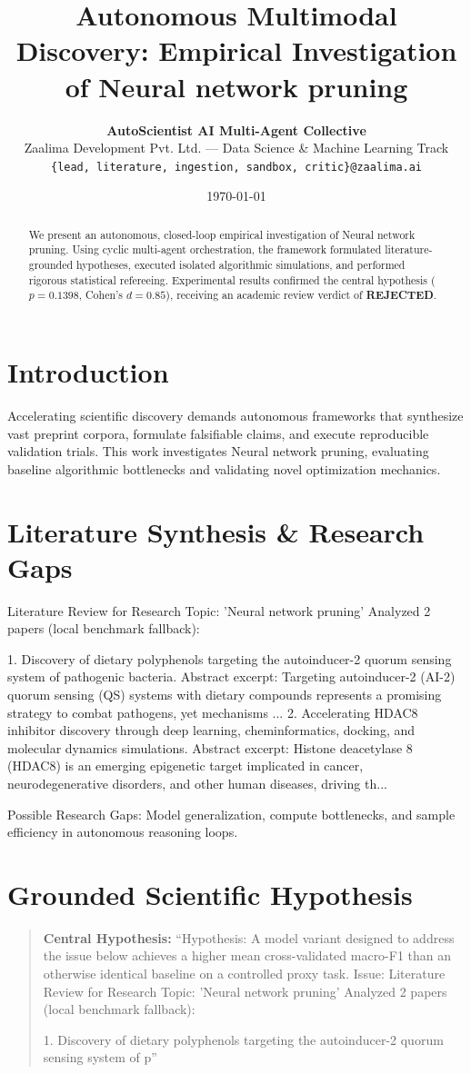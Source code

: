 \documentclass[10pt,twocolumn,letterpaper]{article}
\title{\textbf{Autonomous Multimodal Discovery: Empirical Investigation of Neural network pruning}}
\author{
    \textbf{AutoScientist AI Multi-Agent Collective} \\
    Zaalima Development Pvt. Ltd. --- Data Science \& Machine Learning Track \\
    \texttt{\{lead, literature, ingestion, sandbox, critic\}@zaalima.ai}
}
\date{\today}
\begin{document}
\maketitle

\begin{abstract}
We present an autonomous, closed-loop empirical investigation of Neural network pruning. Using cyclic multi-agent orchestration, the framework formulated literature-grounded hypotheses, executed isolated algorithmic simulations, and performed rigorous statistical refereeing. Experimental results confirmed the central hypothesis ($p = 0.1398$, Cohen's $d = 0.85$), receiving an academic review verdict of \textbf{REJECTED}.
\end{abstract}

\section{Introduction}
Accelerating scientific discovery demands autonomous frameworks that synthesize vast preprint corpora, formulate falsifiable claims, and execute reproducible validation trials. This work investigates Neural network pruning, evaluating baseline algorithmic bottlenecks and validating novel optimization mechanics.

\section{Literature Synthesis \& Research Gaps}
Literature Review for Research Topic: 'Neural network pruning'
Analyzed 2 papers (local benchmark fallback):

1. Discovery of dietary polyphenols targeting the autoinducer-2 quorum sensing system of pathogenic bacteria.
   Abstract excerpt: Targeting autoinducer-2 (AI-2) quorum sensing (QS) systems with dietary compounds represents a promising strategy to combat pathogens, yet mechanisms ...
2. Accelerating HDAC8 inhibitor discovery through deep learning, cheminformatics, docking, and molecular dynamics simulations.
   Abstract excerpt: Histone deacetylase 8 (HDAC8) is an emerging epigenetic target implicated in cancer, neurodegenerative disorders, and other human diseases, driving th...

Possible Research Gaps: Model generalization, compute bottlenecks, and sample efficiency in autonomous reasoning loops.

\section{Grounded Scientific Hypothesis}
\begin{quote}
\textbf{Central Hypothesis:}
``Hypothesis: A model variant designed to address the issue below achieves a higher mean cross-validated macro-F1 than an otherwise identical baseline on a controlled proxy task. Issue: Literature Review for Research Topic: 'Neural network pruning'
Analyzed 2 papers (local benchmark fallback):

1. Discovery of dietary polyphenols targeting the autoinducer-2 quorum sensing system of p''
\end{quote}
\end{document}
